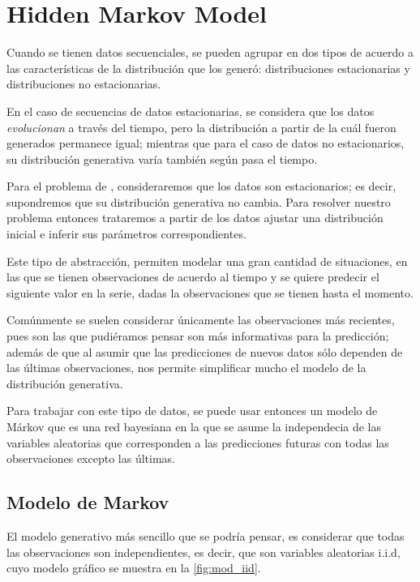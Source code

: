 
\chapter{Hidden Markov Model}\label{ch:chap2}

Cuando se tienen datos secuenciales, se pueden agrupar en dos tipos de acuerdo a las características de la distribución que los generó: distribuciones estacionarias y distribuciones no estacionarias.

En el caso de secuencias de datos estacionarias, se considera que los datos \textit{evolucionan} a través del tiempo, pero la distribución a partir de la cuál fueron generados permanece igual; mientras que para el caso de datos no estacionarios, su distribución generativa varía también según pasa el tiempo.

Para el problema de \sd, consideraremos que los datos son estacionarios; es decir, supondremos que su distribución generativa no cambia. Para resolver nuestro problema entonces trataremos a partir de los datos ajustar una distribución inicial e inferir sus parámetros correspondientes.

Este tipo de abstracción, permiten modelar una gran cantidad de situaciones, en las que se tienen observaciones de acuerdo al tiempo y se quiere predecir el siguiente valor en la serie, dadas la observaciones que se tienen hasta el momento.

Comúnmente se suelen considerar únicamente las observaciones más recientes, pues son las que pudiéramos pensar son más informativas para la predicción; además de que al asumir que las predicciones de nuevos datos sólo dependen de las últimas observaciones, nos permite simplificar mucho el modelo de la distribución generativa.

Para trabajar con este tipo de datos, se puede usar entonces un modelo de Márkov que es una red bayesiana en la que se asume la independecia de las variables aleatorias que corresponden a las predicciones futuras con todas las observaciones excepto las últimas.

\section{Modelo de Markov}

El modelo generativo más sencillo que se podría pensar, es considerar que todas las observaciones son independientes, es decir, que son variables aleatorias i.i.d, cuyo modelo gráfico se muestra en la \autoref{fig:mod_iid}.


